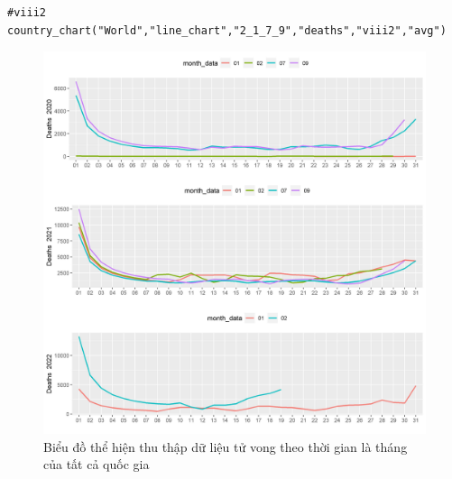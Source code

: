 \documentclass[a4paper]{article}
\theoremstyle{definition}
\begin{document}
\begin{enumerate}[i)]
\begin{enumerate}[1)]
    \begin{lstlisting}
#viii2
country_chart("World","line_chart","2_1_7_9","deaths","viii2","avg")
    \end{lstlisting}
    \begin{figure}[htp]
        \centering
		\includegraphics[scale = 0.7]{Images/VIII/viii2 World .jpeg} 
		\caption{Biểu đồ thể hiện thu thập dữ liệu tử vong theo thời gian là tháng của tất cả quốc gia}
		\label{fig:my_label}
	\end{figure}
	\newpage
	

\end{enumerate}
\end{enumerate}
\end{document}
